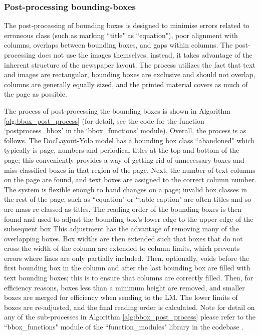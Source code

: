 \documentclass{article} %
\begin{document}
\subsubsection{Post-processing bounding-boxes}
\label{sect:post_process_bbox}
The post-processing of bounding boxes is designed to minimise errors related to erroneous class (such as marking ``title" as ``equation"), poor alignment with columns, overlaps between bounding boxes, and gaps within columns. The post-processing does not use the images themselves; instead, it takes advantage of the inherent structure of the newspaper layout. The process utilizes the fact that text and images are rectangular, bounding boxes are exclusive and should not overlap, columns are generally equally sized, and the printed material covers as much of the page as possible.

The process of post-processing the bounding boxes is shown in Algorithm \ref{alg:bbox_post_process} (for detail, see the code for the function `postprocess\_bbox' in the `bbox\_functions' module). Overall, the process is as follows. The DocLayout-Yolo model has a bounding box class ``abandoned" which typically is page, numbers and periodical titles at the top and bottom of the page; this conveniently provides a way of getting rid of unnecessary boxes and miss-classified boxes in that region of the page. Next, the number of text columns on the page are found, and text boxes are assigned to the correct column number. The system is flexible enough to hand changes on a page; invalid box classes in the rest of the page, such as ``equation" or ``table caption" are often titles and so are mass re-classed as titles. The reading order of the bounding boxes is then found and used to adjust the bounding box's lower edge to the upper edge of the subsequent box This adjustment has the advantage of removing many of the overlapping boxes. Box widths are then extended such that boxes that do not cross the width of the column are extended to column limits, which prevents errors where lines are only partially included. Then, optionally, voids before the first bounding box in the column and after the last bounding box are filled with text bounding boxes; this is to ensure that columns are correctly filled. Then, for efficiency reasons, boxes less than a minimum height are removed, and smaller boxes are merged for efficiency when sending to the LM. The lower limits of boxes are re-adjusted, and the final reading order is calculated. Note for detail on any of the sub-processes in Algorithm \ref{alg:bbox_post_process} please refer to the ``bbox\_functions" module of the ``function\_modules" library in the codebase \cite{bourne_codebase_2025}.
\end{document}
